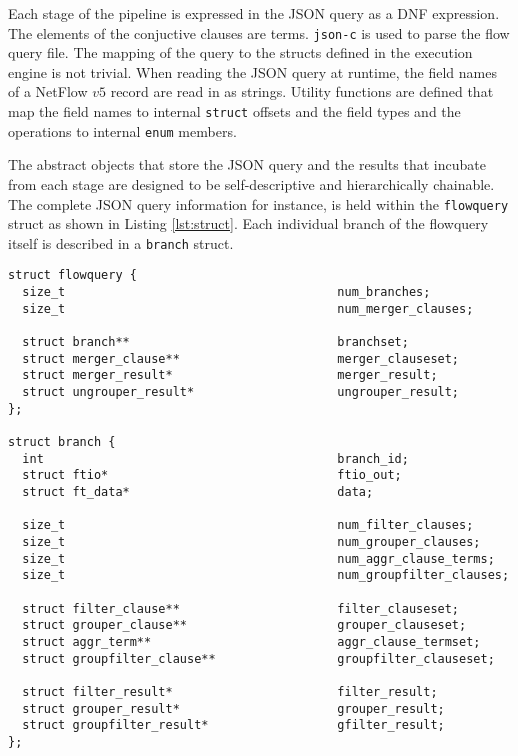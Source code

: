 Each stage of the pipeline is expressed in the JSON query as a \ac{DNF}
expression. The elements of the conjuctive clauses are terms.  \texttt{json-c}
\cite{jsonc} is used to parse the flow query file. The mapping of the query to
the structs defined in the execution engine is not trivial.  When reading the
JSON query at runtime, the field names of a NetFlow $v5$ record are read in as
strings.  Utility functions are defined that map the field names to internal
\texttt{struct} offsets and the field types and the operations to internal
\texttt{enum} members.

The abstract objects that store the JSON query and the results that incubate
from each stage are designed to be self-descriptive and hierarchically
chainable.  The complete JSON query information for instance, is held within
the \texttt{flowquery} struct as shown in Listing \ref{lst:struct}. Each
individual branch of the flowquery itself is described in a \texttt{branch}
struct.

\begin{lstlisting}
struct flowquery {
  size_t                                      num_branches;
  size_t                                      num_merger_clauses;

  struct branch**                             branchset;
  struct merger_clause**                      merger_clauseset;
  struct merger_result*                       merger_result;
  struct ungrouper_result*                    ungrouper_result;
};

struct branch {
  int                                         branch_id;
  struct ftio*                                ftio_out;
  struct ft_data*                             data;

  size_t                                      num_filter_clauses;
  size_t                                      num_grouper_clauses;
  size_t                                      num_aggr_clause_terms;
  size_t                                      num_groupfilter_clauses;

  struct filter_clause**                      filter_clauseset;
  struct grouper_clause**                     grouper_clauseset;
  struct aggr_term**                          aggr_clause_termset;
  struct groupfilter_clause**                 groupfilter_clauseset;

  struct filter_result*                       filter_result;
  struct grouper_result*                      grouper_result;
  struct groupfilter_result*                  gfilter_result;
};
\end{lstlisting}

